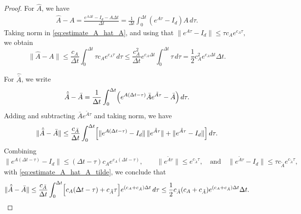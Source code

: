 \documentclass[a4paper, 10pt, english, reqno]{amsart}
\begin{document}
\begin{proof}
For $\hat A$, we have
\begin{align}\label{eq:estimate_A_hat_A}
     \hat A-A
    =
    \frac{e^{A\Delta t}-I_d-A\Delta t}{\Delta t}
    =
    \frac1{\Delta t}\int_0^{\Delta t}(e^{A\tau}-I_d)A\,d\tau.
\end{align}
Taking norm in \eqref{eq:estimate_A_hat_A}, and using that $\|e^{A\tau}-I_d\|
\le
\tau c_A e^{c_A\tau},$ we obtain
\[
    \|\hat A-A\|
    \le
    \frac{c_A}{\Delta t}\int_0^{\Delta t}\tau c_A e^{c_A\tau}\,d\tau
    \le
    \frac{c_A^2}{\Delta t}e^{c_A\Delta t}\int_0^{\Delta t}\tau\,d\tau
    =
    \frac12 c_A^2 e^{c_A\Delta t}\Delta t.
\]

For $\hat{\bar A}$, we write
\[
    \hat{\bar A}-\bar A
    =
    \frac1{\Delta t}\int_0^{\Delta t}
    \Bigl(
        e^{A(\Delta t-\tau)}\bar A e^{\tilde A\tau}-\bar A
    \Bigr)\,d\tau.
\]
Adding and subtracting $\bar A e^{\tilde A\tau}$ and taking norm, we have
\begin{align}\label{eq:estimate_A_hat_A_tilde}
        \|\hat{\bar A}-\bar A\|
    \le
    \frac{c_{\bar A}}{\Delta t}\int_0^{\Delta t}
    \Bigl[
        \|e^{A(\Delta t-\tau)}-I_d\|\,\|e^{\tilde A\tau}\|
        +
        \|e^{\tilde A\tau}-I_d\|
    \Bigr]\,d\tau.
\end{align}
Combining
\[
\|e^{A(\Delta t-\tau)}-I_d\|
\le
(\Delta t-\tau)c_A e^{c_A(\Delta t-\tau)},
\qquad
\|e^{\tilde A\tau}\|\le e^{c_{\tilde A}\tau},\quad
\text{and}\quad\|e^{\tilde A\tau}-I_d\|
\le
\tau c_{\tilde A}e^{c_{\tilde A}\tau},
\]
with \eqref{eq:estimate_A_hat_A_tilde}, we conclude that
\[
    \|\hat{\bar A}-\bar A\|
    \le
    \frac{c_{\bar A}}{\Delta t}
    \int_0^{\Delta t}
    \Bigl[
        c_A(\Delta t-\tau)
        +
        c_{\tilde A}\tau
    \Bigr]
    e^{(c_A+c_{\tilde A})\Delta t}\,d\tau\le
    \frac12 c_{\bar A}(c_A+c_{\tilde A})
    e^{(c_A+c_{\tilde A})\Delta t}\Delta t.
\]


\end{proof}
\end{document}
